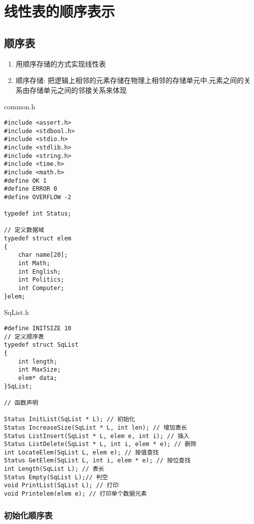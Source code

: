 \section{线性表的顺序表示}
\subsection{顺序表}
\begin{definition}[顺序表]
    \begin{enumerate}
        \item 用顺序存储的方式实现线性表
        \item 顺序存储: 把逻辑上相邻的元素存储在物理上相邻的存储单元中,元素之间的关系由存储单元之间的邻接关系来体现
    \end{enumerate}
\end{definition}

\begin{macbox}{common.h}
	\begin{verbatim}
#include <assert.h>
#include <stdbool.h>
#include <stdio.h>
#include <stdlib.h>
#include <string.h>
#include <time.h>
#include <math.h>
#define OK 1
#define ERROR 0
#define OVERFLOW -2

typedef int Status;

// 定义数据域
typedef struct elem
{
    char name[20];
    int Math;
    int English;
    int Politics;
    int Computer; 
}elem;
    \end{verbatim}
\end{macbox}

\begin{macbox}{SqList.h}
	\begin{verbatim}
#define INITSIZE 10
// 定义顺序表
typedef struct SqList
{
    int length;
    int MaxSize;
    elem* data;
}SqList;

// 函数声明 

Status InitList(SqList * L); // 初始化
Status IncreaseSize(SqList * L, int len); // 增加表长
Status ListInsert(SqList * L, elem e, int i); // 插入
Status ListDelete(SqList * L, int i, elem * e); // 删除
int LocateElem(SqList L, elem e); // 按值查找
Status GetElem(SqList L, int i, elem * e); // 按位查找 
int Length(SqList L); // 表长
Status Empty(SqList L);// 判空
void PrintList(SqList L); // 打印
void Printelem(elem e); // 打印单个数据元素
    \end{verbatim}
\end{macbox}


\subsubsection{初始化顺序表}

